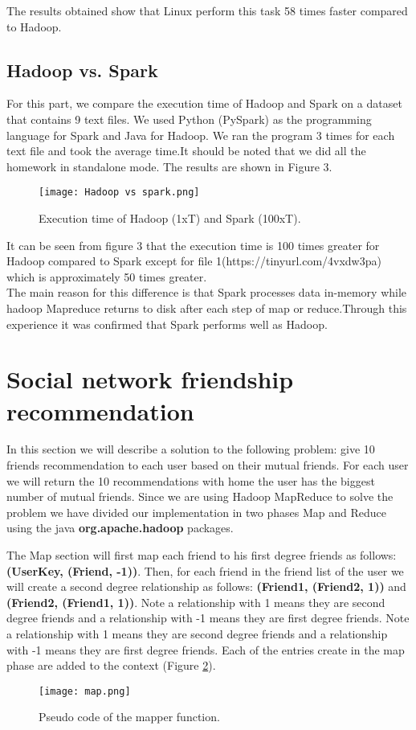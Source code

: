 \documentclass[12pt]{article}
\begin{document}
\noindent The results obtained show that Linux perform this task 58 times faster compared to Hadoop.

\subsection{Hadoop vs. Spark}
For this part, we compare the execution time of Hadoop and Spark on a dataset that contains 9 text files. We used Python (PySpark) as the programming language for Spark and Java for Hadoop. We ran the program 3 times for each text file and took the average time.It should be noted that we did all the homework in standalone mode. The results are shown in Figure 3.

\begin{figure}[h]
  \centering
  \texttt{[image: Hadoop vs spark.png]}
  \caption{Execution time of Hadoop (1xT) and Spark (100xT).}
  \label{fig:hadoop vs spark}
\end{figure}
It can be seen from figure 3 that the execution time is 100 times greater for Hadoop compared to Spark except for file 1(https://tinyurl.com/4vxdw3pa) which is approximately 50 times greater.\\
The main reason for this difference is that Spark processes data in-memory while hadoop Mapreduce returns to disk after each step of map or reduce.Through this experience it was confirmed that Spark performs well as Hadoop.
\section{Social network friendship recommendation}
In this section we will describe a solution to the following problem:
give 10 friends recommendation to each user based on their mutual friends.
For each user we will return the 10 recommendations with home the user has the biggest number of mutual friends. Since we are using Hadoop MapReduce to solve the problem we have divided our implementation in two phases Map and Reduce using the java \textbf{org.apache.hadoop} packages.


The Map section will first map each friend to his first degree friends as follows: \textbf{(UserKey, (Friend, -1))}.
Then, for each friend in the friend list of the user we will create a second degree relationship as follows: \textbf{(Friend1, (Friend2, 1))} and \textbf{(Friend2, (Friend1, 1))}. Note a relationship with 1 means they are second degree friends and a relationship with -1 means they are first degree friends. Note a relationship with 1 means they are second degree friends and a relationship with -1 means they are first degree friends. Each of the entries create in the map phase are added to the context (Figure \ref{fig:map}).
\begin{figure}[h]
  \centering
  \texttt{[image: map.png]}
  \caption{Pseudo code of the mapper function.}
  \label{fig:map}
\end{figure}
\end{document}
